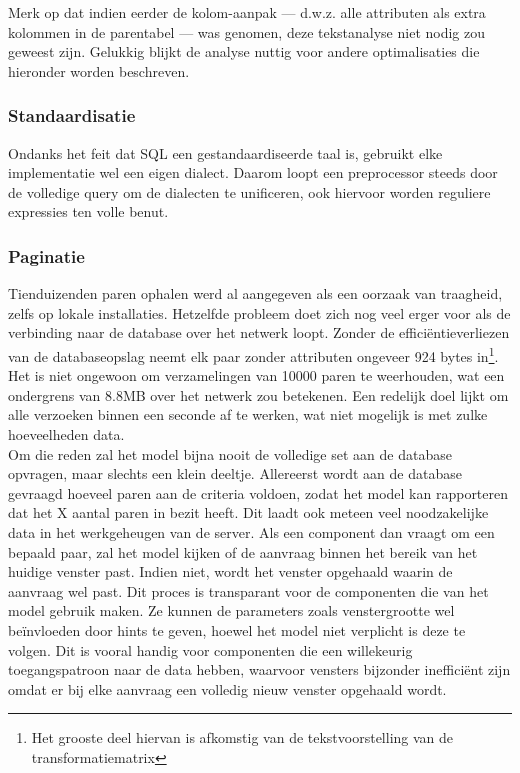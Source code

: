 Merk op dat indien eerder de kolom-aanpak --- d.w.z. alle attributen als extra kolommen in de parentabel --- was genomen, deze tekstanalyse niet nodig zou geweest zijn. Gelukkig blijkt de analyse nuttig voor andere optimalisaties die hieronder worden beschreven. 

\subsubsection{Standaardisatie}
Ondanks het feit dat SQL een gestandaardiseerde taal is, gebruikt elke implementatie wel een eigen dialect. Daarom loopt een preprocessor steeds door de volledige query om de dialecten te unificeren, ook hiervoor worden reguliere expressies ten volle benut.

\subsubsection{Paginatie}
Tienduizenden paren ophalen werd al aangegeven als een oorzaak van traagheid, zelfs op lokale installaties. Hetzelfde probleem doet zich nog veel erger voor als de verbinding naar de database over het netwerk loopt. Zonder de effici\"entieverliezen van de databaseopslag neemt elk paar zonder attributen ongeveer 924 bytes in\footnote{Het grooste deel hiervan is afkomstig van de tekstvoorstelling van de transformatiematrix}. Het is niet ongewoon om verzamelingen van 10000 paren te weerhouden, wat een ondergrens van 8.8MB over het netwerk zou betekenen. Een redelijk doel lijkt om alle verzoeken binnen een seconde af te werken, wat niet mogelijk is met zulke hoeveelheden data.\\

Om die reden zal het model bijna nooit de volledige set aan de database opvragen, maar slechts een klein deeltje. Allereerst wordt aan de database gevraagd hoeveel paren aan de criteria voldoen, zodat het model kan rapporteren dat het X aantal paren in bezit heeft. Dit laadt ook meteen veel noodzakelijke data in het werkgeheugen van de server. Als een component dan vraagt om een bepaald paar, zal het model kijken of de aanvraag binnen het bereik van het huidige venster past. Indien niet, wordt het venster opgehaald waarin de aanvraag wel past. Dit proces is transparant voor de componenten die van het model gebruik maken. Ze kunnen de parameters zoals venstergrootte wel be\"invloeden door hints te geven, hoewel het model niet verplicht is deze te volgen. Dit is vooral handig voor componenten die een willekeurig toegangspatroon naar de data hebben, waarvoor vensters bijzonder ineffici\"ent zijn omdat er bij elke aanvraag een volledig nieuw venster opgehaald wordt.

